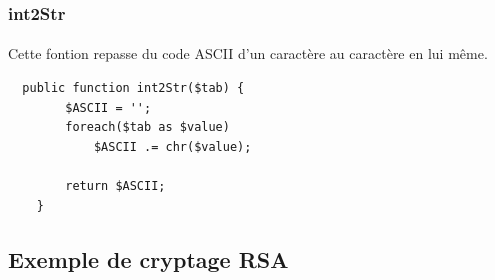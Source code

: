 \documentclass[12pt,a4paper]{report}
\begin{document}
\begin{itemize}
\subsubsection{int2Str}
\paragraph{} Cette fontion repasse du code ASCII d'un caractère au caractère en lui même.
\begin{lstlisting}
  public function int2Str($tab) {
        $ASCII = '';
        foreach($tab as $value)
            $ASCII .= chr($value); 
        
        return $ASCII;
    }
\end{lstlisting}

\subsection{Exemple de cryptage RSA}


\end{itemize}
\end{document}
